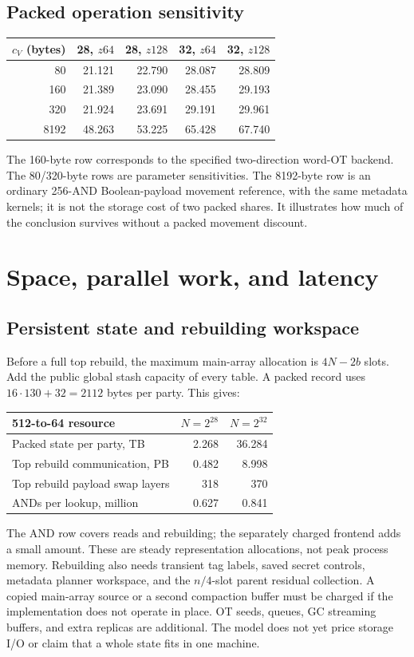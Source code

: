 \documentclass[11pt]{article}
\begin{document}
\subsection{Packed operation sensitivity}
\begin{center}\small
\begin{tabular}{rrrrr}\toprule
$c_V$ (bytes) & 28, $z64$ & 28, $z128$ & 32, $z64$ & 32, $z128$\\\midrule
80 & 21.121 & 22.790 & 28.087 & 28.809\\
160 & 21.389 & 23.090 & 28.455 & 29.193\\
320 & 21.924 & 23.691 & 29.191 & 29.961\\
8192 & 48.263 & 53.225 & 65.428 & 67.740\\
\bottomrule\end{tabular}\end{center}
The 160-byte row corresponds to the specified two-direction word-OT
backend. The 80/320-byte rows are parameter sensitivities. The 8192-byte
row is an ordinary 256-AND Boolean-payload movement reference, with the
same metadata kernels; it is not the storage cost of two packed shares.
It illustrates how much of the conclusion survives without a packed
movement discount.

\section{Space, parallel work, and latency}\label{sec:resources}
\subsection{Persistent state and rebuilding workspace}
Before a full top rebuild, the maximum main-array allocation is
$4N-2b$ slots. Add the public global stash capacity of every table. A
packed record uses $16\cdot130+32=2112$ bytes per party. This gives:
\begin{center}\small
\begin{tabular}{lrr}\toprule
512-to-64 resource & $N=2^{28}$ & $N=2^{32}$\\\midrule
Packed state per party, TB & 2.268 & 36.284\\
Top rebuild communication, PB & 0.482 & 8.998\\
Top rebuild payload swap layers & 318 & 370\\
ANDs per lookup, million & 0.627 & 0.841\\
\bottomrule\end{tabular}\end{center}
The AND row covers reads and rebuilding; the separately charged frontend adds a small amount.
These are steady representation allocations, not peak process memory.
Rebuilding also needs transient tag labels, saved secret controls, metadata
planner workspace, and the $n/4$-slot parent residual collection. A copied
main-array source or a second compaction buffer must be charged if the
implementation does not operate in place. OT seeds, queues, GC streaming
buffers, and extra replicas are additional. The model does not yet price
storage I/O or claim that a whole state fits in one machine.
\end{document}
